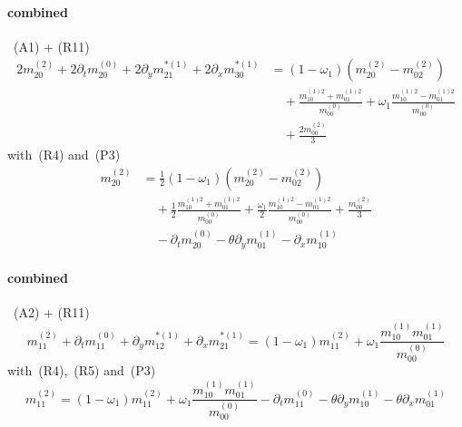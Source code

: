 \documentclass{article}
\begin{document}
  \paragraph{combined}~(A1) + (R11)
  \begin{equation*}
    \begin{aligned}
      2m_{20}^{(2)} + 2\partial_t m_{20}^{(0)} + 2\partial_y m_{21}^{*(1)} + 2\partial_x m_{30}^{*(1)}
      &= (1-\omega_1) \left(m_{20}^{(2)}-m_{02}^{(2)}\right)
      \\&\quad
      + \frac{ m_{10}^{(1)2} + m_{01}^{(1)2}}{m_{00}^{(0)}} + \omega_1 \frac{ m_{10}^{(1)2} - m_{01}^{(1)2}}{m_{00}^{(0)}}
      \\&\quad
      + \frac{2 m_{00}^{(2)}}{3}
    \end{aligned}
  \end{equation*}
  with~(R4) and~(P3)
  \begin{equation}
    \tag{C1}
    \begin{aligned}
      m_{20}^{(2)} &= \frac{1}{2}(1-\omega_1) \left(m_{20}^{(2)}-m_{02}^{(2)}\right)
      \\&\quad
      + \frac{1}{2}\frac{ m_{10}^{(1)2} + m_{01}^{(1)2}}{m_{00}^{(0)}} + \frac{\omega_1}{2} \frac{ m_{10}^{(1)2} - m_{01}^{(1)2}}{m_{00}^{(0)}}
      + \frac{m_{00}^{(2)}}{3}
      \\&\quad
      - \partial_t m_{20}^{(0)} - \theta\partial_y m_{01}^{(1)} - \partial_x m_{10}^{(1)}
    \end{aligned}
  \end{equation}
  \paragraph{combined}~(A2) + (R11)
  \begin{equation*}
    m_{11}^{(2)} + \partial_t m_{11}^{(0)} + \partial_y m_{12}^{*(1)} + \partial_x m_{21}^{*(1)} = (1-\omega_1)m_{11}^{(2)} + \omega_1 \frac{ m_{10}^{(1)}m_{01}^{(1)}}{m_{00}^{(0)}}
  \end{equation*}
  with~(R4),~(R5) and~(P3)
  \begin{equation}
    \tag{C2}
    m_{11}^{(2)} = (1-\omega_1)m_{11}^{(2)} + \omega_1 \frac{ m_{10}^{(1)}m_{01}^{(1)}}{m_{00}^{(0)}}  - \partial_t m_{11}^{(0)} - \theta\partial_y m_{10}^{(1)} - \theta\partial_x m_{01}^{(1)}
  \end{equation}
  \pagebreak
\end{document}
